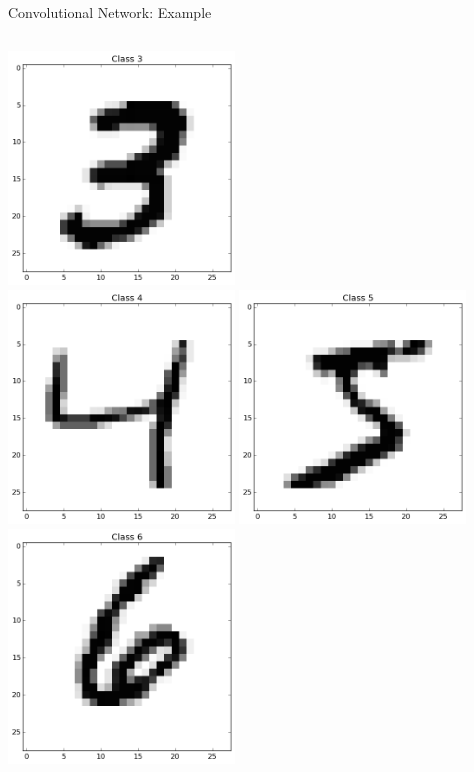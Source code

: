 \documentclass[10pt, aspectratio=169]{beamer} %
\begin{document}
\begin{frame}[fragile]{Convolutional Network: Example}
\begin{columns}
\includegraphics[width=0.45\textwidth]{mnist_3.png}\\
\includegraphics[width=0.45\textwidth]{mnist_4.png}
\includegraphics[width=0.45\textwidth]{mnist_5.png}\\
\includegraphics[width=0.45\textwidth]{mnist_6.png}

\end{columns}
\end{frame}
\end{document}

